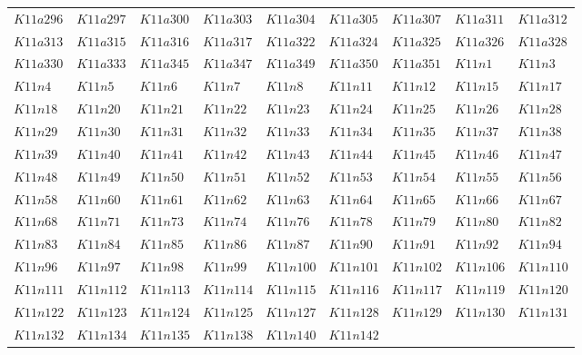 \documentclass{amsart} %
\theoremstyle{thm}
\theoremstyle{definition}
\numberwithin{equation}{section}
\begin{document}
{\begin{longtable}{@{}lllllllll@{}}
  $K11a296$ &  
  $K11a297$ &  
  $K11a300$ &  
  $K11a303$ &  
  $K11a304$ &  
  $K11a305$ &  
  $K11a307$ &  
  $K11a311$ &  
  $K11a312$ \\   
  $K11a313$ &  
  $K11a315$ &  
  $K11a316$ &  
  $K11a317$ &  
  $K11a322$ &  
  $K11a324$ &  
  $K11a325$ &  
  $K11a326$ &  
  $K11a328$ \\   
  $K11a330$ &  
  $K11a333$ &  
  $K11a345$ &  
  $K11a347$ &  
  $K11a349$ &  
  $K11a350$ &  
  $K11a351$ &  
  $K11n1$ &  
  $K11n3$ \\  
  $K11n4$ &  
  $K11n5$ &  
  $K11n6$ &  
  $K11n7$ &  
  $K11n8$ &  
  $K11n11$ &  
  $K11n12$ &  
  $K11n15$ &  
  $K11n17$ \\   
  $K11n18$ &  
  $K11n20$ &  
  $K11n21$ &  
  $K11n22$ &  
  $K11n23$ &  
  $K11n24$ &  
  $K11n25$ &  
  $K11n26$ &  
  $K11n28$ \\   
  $K11n29$ &  
  $K11n30$ &  
  $K11n31$ &  
  $K11n32$ &  
  $K11n33$ &  
  $K11n34$ &  
  $K11n35$ &  
  $K11n37$ &  
  $K11n38$ \\   
  $K11n39$ &  
  $K11n40$ &  
  $K11n41$ &  
  $K11n42$ &  
  $K11n43$ &  
  $K11n44$ &  
  $K11n45$ &  
  $K11n46$ &  
  $K11n47$ \\   
  $K11n48$ &  
  $K11n49$ &  
  $K11n50$ &  
  $K11n51$ &  
  $K11n52$ &  
  $K11n53$ &  
  $K11n54$ &  
  $K11n55$ &  
  $K11n56$ \\   
  $K11n58$ &  
  $K11n60$ &  
  $K11n61$ &  
  $K11n62$ &  
  $K11n63$ &  
  $K11n64$ &  
  $K11n65$ &  
  $K11n66$ &  
  $K11n67$ \\   
  $K11n68$ &  
  $K11n71$ &  
  $K11n73$ &  
  $K11n74$ &  
  $K11n76$ &  
  $K11n78$ &  
  $K11n79$ &  
  $K11n80$ &  
  $K11n82$ \\   
  $K11n83$ &  
  $K11n84$ &  
  $K11n85$ &  
  $K11n86$ &  
  $K11n87$ &  
  $K11n90$ &  
  $K11n91$ &  
  $K11n92$ &  
  $K11n94$ \\   
  $K11n96$ &  
  $K11n97$ &  
  $K11n98$ &  
  $K11n99$ &  
  $K11n100$ &  
  $K11n101$ &  
  $K11n102$ &  
  $K11n106$ &  
  $K11n110$ \\   
  $K11n111$ &  
  $K11n112$ &  
  $K11n113$ &  
  $K11n114$ &  
  $K11n115$ &  
  $K11n116$ &  
  $K11n117$ &  
  $K11n119$ &  
  $K11n120$ \\   
  $K11n122$ &  
  $K11n123$ &  
  $K11n124$ &  
  $K11n125$ &  
  $K11n127$ &  
  $K11n128$ &  
  $K11n129$ &  
  $K11n130$ &  
  $K11n131$ \\   
  $K11n132$ &  
  $K11n134$ &  
  $K11n135$ &  
  $K11n138$ &  
  $K11n140$ &  
  $K11n142$ &  

\end{longtable}}
\end{document}
